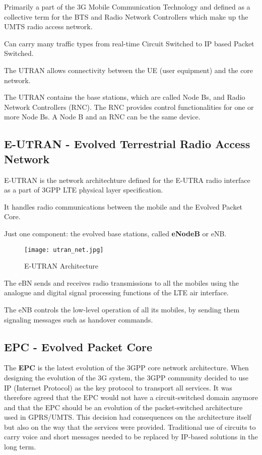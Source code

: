 Primarily a part of the 3G Mobile Communication Technology and defined as a
collective term for the BTS and Radio Network Controllers which make up the
UMTS radio access network.

Can carry many traffic types from real-time Circuit Switched to IP based Packet
Switched.

The UTRAN allows connectivity between the UE (user equipment) and the core
network.

The UTRAN contains the base stations, which are called Node Bs, and Radio
Network Controllers (RNC).
The RNC provides control functionalities for one or more Node Bs.
A Node B and an RNC can be the same device.

\subsection{E-UTRAN - Evolved Terrestrial Radio Access Network}

E-UTRAN is the network architechture defined for the E-UTRA radio interface as
a part of 3GPP LTE physical layer specification.

It handles radio communications between the mobile and the Evolved Packet Core.

Just one component: the evolved base stations, called \textbf{eNodeB} or eNB.

\begin{figure}[H]
  \centering
  \texttt{[image: utran\_net.jpg]}
  \caption{E-UTRAN Architecture}
  \label{fig:utran_net}
\end{figure}

The eBN sends and receives radio transmissions to all the mobiles using the
analogue and digital signal processing functions of the LTE air interface.

The eNB controls the low-level operation of all its mobiles, by sending them
signaling messages such as handover commands.

\subsection{EPC - Evolved Packet Core}

The \textbf{EPC} is the latest evolution of the 3GPP core network architecture.
When designing the evolution of the 3G system, the 3GPP community decided to
use IP (Internet Protocol) as the key protocol to transport all services.
It was therefore agreed that the EPC would not have a circuit-switched domain
anymore and that the EPC should be an evolution of the packet-switched
architecture used in GPRS/UMTS.
This decision had consequences on the architecture itself but also on the way
that the services were provided.
Traditional use of circuits to carry voice and short messages needed to be
replaced by IP-based solutions in the long term.

